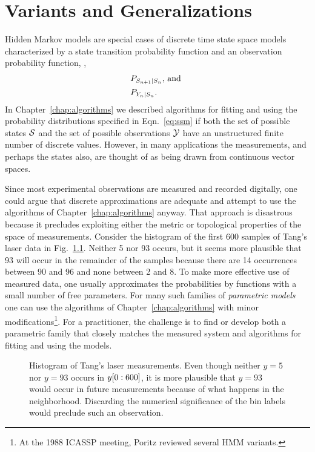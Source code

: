 
\chapter{Variants and Generalizations}
\label{chap:variants}

Hidden Markov models are special cases of discrete time state space
models characterized by a state transition probability function and an
observation probability function, \ie,
\begin{subequations}
  \label{eq:ssm}
  \begin{align}
      &P_{S_{n+1}\mid S_n}\text{, and }\\
      &P_{Y_n\mid S_n}.
  \end{align}
\end{subequations}
In Chapter~\ref{chap:algorithms} we described algorithms for fitting
and using the probability distributions specified in
Eqn.~\eqref{eq:ssm} if both the set of possible states $\states$ and
the set of possible observations $\outputs$ have an unstructured
finite number of discrete values.  However, in many applications the
measurements, and perhaps the states also, are thought of as being
drawn from continuous vector spaces.

Since most experimental observations are measured and recorded
digitally, one could argue that discrete approximations are adequate
and attempt to use the algorithms of Chapter~\ref{chap:algorithms}
anyway.  That approach is disastrous because it precludes exploiting
either the metric or topological properties of the space of
measurements.  Consider the histogram of the first 600 samples of
Tang's laser data in Fig.~\ref{fig:LaserHist}.  Neither 5 nor 93
occurs, but it seems more plausible that 93 will occur in the
remainder of the samples because there are 14 occurrences between 90
and 96 and none between 2 and 8.  To make more effective use of
measured data, one usually approximates the probabilities by functions
with a small number of free parameters.  For many such families of
\emph{parametric models} one can use the algorithms of
Chapter~\ref{chap:algorithms} with minor modifications\footnote{At the
  1988 ICASSP meeting, Poritz\cite{Poritz88} reviewed several HMM
  variants.}.  For a practitioner, the challenge is to find or develop
both a parametric family that closely matches the measured system and
algorithms for fitting and using the models.

\begin{figure}[htbp]
  \caption[Histogram of Tang's laser measurements.]%
  {Histogram of Tang's laser measurements.  Even though neither $y=5$
    nor $y=93$ occurs in $y[0:600]$, it is more plausible that
    $y=93$ would occur in future measurements because of what happens
    in the neighborhood.  Discarding the numerical significance of the
    bin labels would preclude such an observation. }
  \label{fig:LaserHist}
\end{figure}


